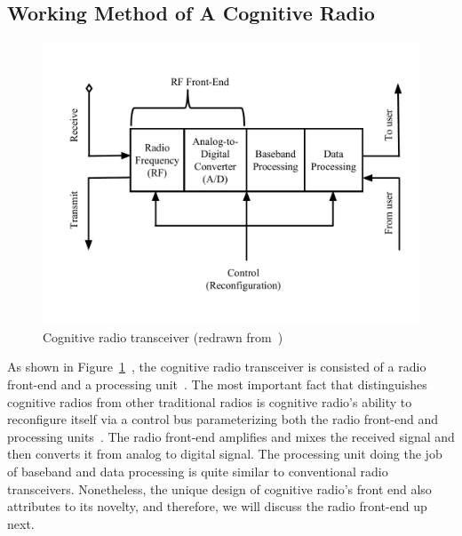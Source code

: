 \subsection{Working Method of A Cognitive Radio}

\begin{figure}[!htbp]
\begin{center}
    \includegraphics[scale=0.5]{myFigures/PhysicalCR}
    \caption{Cognitive radio transceiver (redrawn from~\cite{jondral2005software})}
    \label{fig:PhysicalCR}
\end{center}
\end{figure}

As shown in Figure~\ref{fig:PhysicalCR}~\cite{jondral2005software}, the cognitive radio transceiver is consisted of a radio front-end and a processing unit~\cite{akyildiz2006next}. The most important fact that distinguishes cognitive radios from other traditional radios is cognitive radio's ability to reconfigure itself via a control bus parameterizing both the radio front-end and processing units~\cite{jondral2005software}. The radio front-end amplifies and mixes the received signal and then converts it from analog to digital signal. The processing unit doing the job of baseband and data processing is quite similar to conventional radio transceivers. Nonetheless, the unique design of cognitive radio's front end also attributes to its novelty, and therefore, we will discuss the radio front-end up next.


